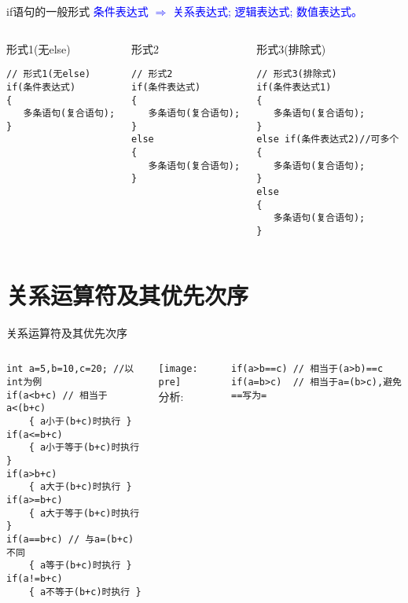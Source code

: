 \begin{frame}{if语句的一般形式}
\vspace{-0.2cm}
\textcolor{blue}{条件表达式 $\Rightarrow$ 关系表达式; 逻辑表达式; 数值表达式。}
\begin{columns}[t]
\begin{beamerboxesrounded}{形式1(无else)}
\begin{lstlisting}
// 形式1(无else)
if(条件表达式)
{
   多条语句(复合语句);
}
\end{lstlisting}
\end{beamerboxesrounded}
\begin{beamerboxesrounded}{形式2}
\begin{lstlisting}
// 形式2
if(条件表达式)
{
   多条语句(复合语句);
}
else
{
   多条语句(复合语句);
}
\end{lstlisting} 
\end{beamerboxesrounded}
\begin{beamerboxesrounded}{形式3(排除式)}
\begin{lstlisting}
// 形式3(排除式)
if(条件表达式1)
{
   多条语句(复合语句);
}
else if(条件表达式2)//可多个
{
   多条语句(复合语句);
}
else
{
   多条语句(复合语句);
}
\end{lstlisting}
\end{beamerboxesrounded}
\end{columns}                        
\end{frame}

\section{关系运算符及其优先次序}

\begin{frame}{关系运算符及其优先次序}
\begin{columns}%
\begin{lstlisting}
int a=5,b=10,c=20; //以int为例
if(a<b+c) // 相当于a<(b+c)
	{ a小于(b+c)时执行 }
if(a<=b+c) 
	{ a小于等于(b+c)时执行 }
if(a>b+c) 
	{ a大于(b+c)时执行 }
if(a>=b+c) 
	{ a大于等于(b+c)时执行 }
if(a==b+c) // 与a=(b+c)不同
	{ a等于(b+c)时执行 }
if(a!=b+c) 
	{ a不等于(b+c)时执行 }
\end{lstlisting}
\texttt{[image: pre]}\\
分析:
\begin{lstlisting}
if(a>b==c) // 相当于(a>b)==c
if(a=b>c)  // 相当于a=(b>c),避免==写为=
\end{lstlisting}
\end{columns}
\end{frame}

